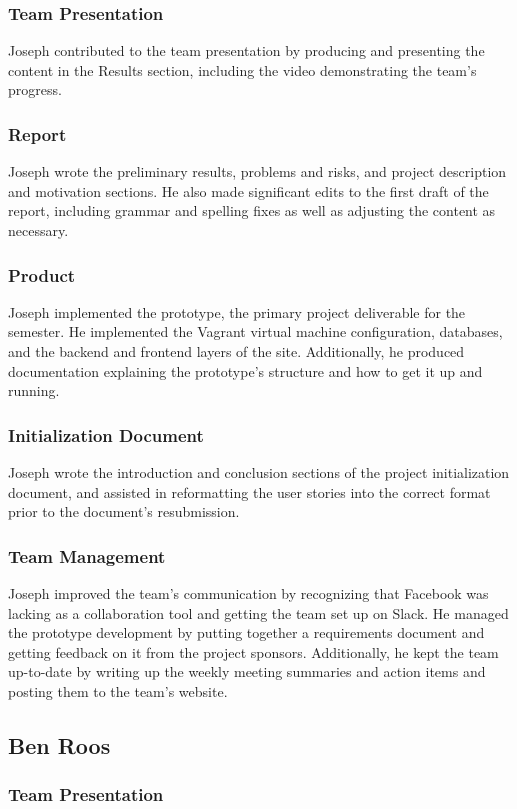 \documentclass[12pt]{article}
\begin{document}
\begin{spacing}{1.5}
\subsubsection{Team Presentation}
Joseph contributed to the team presentation by producing and presenting the content in the Results section, including the video demonstrating the team's progress.
\subsubsection{Report}
Joseph wrote the preliminary results, problems and risks, and project description and motivation sections. He also made significant edits to the first draft of the report, including grammar and spelling fixes as well as adjusting the content as necessary.
\subsubsection{Product}
Joseph implemented the prototype, the primary project deliverable for the semester. He implemented the Vagrant virtual machine configuration, databases, and the backend and frontend layers of the site. Additionally, he produced documentation explaining the prototype's structure and how to get it up and running.
\subsubsection{Initialization Document}
Joseph wrote the introduction and conclusion sections of the project initialization document, and assisted in reformatting the user stories into the correct format prior to the document's resubmission.
\subsubsection{Team Management}
Joseph improved the team's communication by recognizing that Facebook was lacking as a collaboration tool and getting the team set up on Slack. He managed the prototype development by putting together a requirements document and getting feedback on it from the project sponsors. Additionally, he kept the team up-to-date by writing up the weekly meeting summaries and action items and posting them to the team's website.

\clearpage

\subsection{Ben Roos}
\subsubsection{Team Presentation}

\end{spacing}
\end{document}

